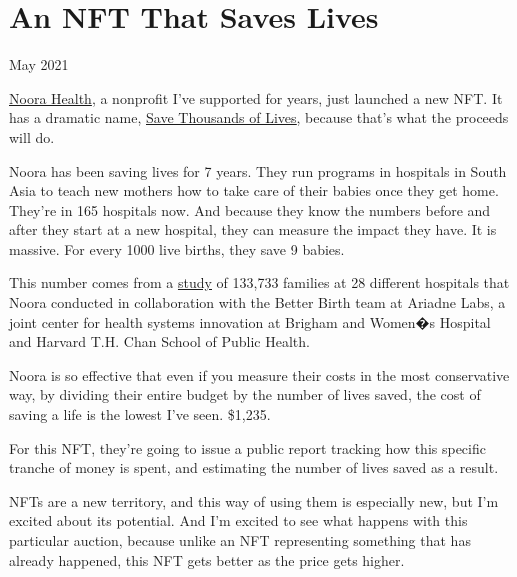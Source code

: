 \chapter{An NFT That Saves Lives}


            
              
                

May 2021

\href{https://www.noorahealth.org/}{Noora Health}, a nonprofit I've supported for years, just launched a new
                  NFT. It has a dramatic name,
                  \href{http://bit.ly/NooraNFT}{\underline{Save Thousands of Lives}}, because that's what the proceeds will do.

Noora
                  has been saving lives for 7 years. They run programs in
                  hospitals in South Asia to teach new mothers how to take care
                  of their babies once they get home. They're in 165 hospitals
                  now. And because they know the numbers before and after they
                  start at a new hospital, they can measure the impact they
                  have. It is massive. For every 1000 live births, they save 9
                  babies.

This number comes from a
                  \href{http://bit.ly/NFT-research}{\underline{study}} of
                  133,733 families at 28 different hospitals that Noora
                  conducted in collaboration with the Better Birth team at
                  Ariadne Labs, a joint center for health systems innovation at
                  Brigham and Women�s Hospital and Harvard T.H. Chan School of
                  Public Health.

Noora is so effective that even if
                  you measure their costs in the most conservative way, by
                  dividing their entire budget by the number of lives saved, the
                  cost of saving a life is the lowest I've seen. \$1,235.

For
                  this NFT, they're going to issue a public report tracking how
                  this specific tranche of money is spent, and estimating the
                  number of lives saved as a result.

NFTs are a new
                  territory, and this way of using them is especially new, but
                  I'm excited about its potential. And I'm excited to see what
                  happens with this particular auction, because unlike an NFT
                  representing something that has already happened, this NFT
                  gets better as the price gets higher.

